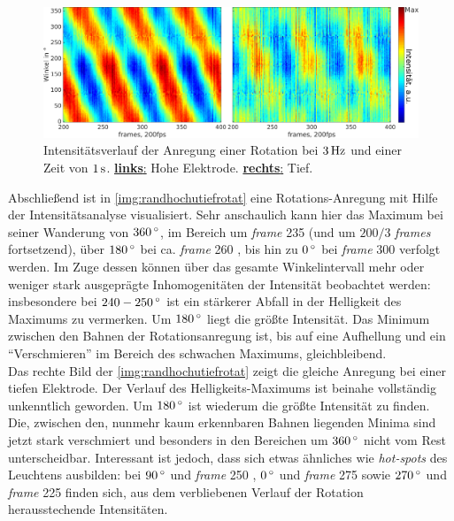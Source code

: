 \documentclass[numbers=noenddot,a4paper,notitlepage,twoside,BCOR15mm]{scrbook}
\newcommand{\degree}{^\circ}
\newcommand{\tilt}[1]{\textit{#1}}
\newcommand{\fett}[1]{\textbf{#1}}
\begin{document}
				\begin{figure}[!t]
					\centering
					\includegraphics[width=\textwidth]{figs/auswertung/plasmaglw/randrotathochutief3Hz1sekwink.png}
					\caption{Intensitätsverlauf der Anregung einer Rotation bei $\unit[3]{Hz}$ und einer Zeit von $\unit[1]{s}$. \underline{\fett{links}:} Hohe Elektrode. \underline{\fett{rechts}:} Tief.}
					\label{img:randhochutiefrotat}
				\end{figure}

			Abschließend ist in \autoref{img:randhochutiefrotat} eine Rotations-Anregung mit Hilfe der Intensitätsanalyse visualisiert. Sehr anschaulich kann hier das Maximum bei seiner Wanderung von $\unit[360]{\degree}$, im Bereich um \tilt{frame} 235 (und um $200/3$ \tilt{frames} fortsetzend), über $\unit[180]{\degree}$ bei ca. \tilt{frame} 260 , bis hin zu $\unit[0]{\degree}$ bei \tilt{frame} 300 verfolgt werden. Im Zuge dessen können über das gesamte Winkelintervall mehr oder weniger stark ausgeprägte Inhomogenitäten der Intensität beobachtet werden: insbesondere bei $\unit[240-250]{\degree}$ ist ein stärkerer Abfall in der Helligkeit des Maximums zu vermerken. Um $\unit[180]{\degree}$ liegt die größte Intensität. Das Minimum zwischen den Bahnen der Rotationsanregung ist, bis auf eine Aufhellung und ein "`Verschmieren"' im Bereich des schwachen Maximums, gleichbleibend.\\
			Das rechte Bild der \autoref{img:randhochutiefrotat} zeigt die gleiche Anregung bei einer tiefen Elektrode. Der Verlauf des Helligkeits-Maximums ist beinahe vollständig unkenntlich geworden. Um $\unit[180]{\degree}$ ist wiederum die größte Intensität zu finden. Die, zwischen den, nunmehr kaum erkennbaren Bahnen liegenden Minima sind jetzt stark verschmiert und besonders in den Bereichen um $\unit[360]{\degree}$ nicht vom Rest unterscheidbar. Interessant ist jedoch, dass sich etwas ähnliches wie \tilt{hot-spots} des Leuchtens ausbilden: bei $\unit[90]{\degree}$ und \tilt{frame} 250 , $\unit[0]{\degree}$ und  \tilt{frame} 275 sowie $\unit[270]{\degree}$ und \tilt{frame} 225 finden sich, aus dem verbliebenen Verlauf der Rotation herausstechende Intensitäten. 
\end{document}
